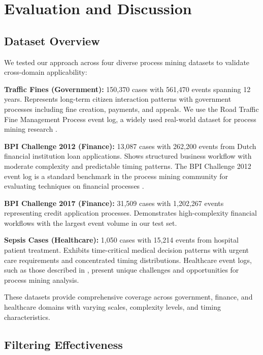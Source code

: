 
\section{Evaluation and Discussion}
\label{sec:evaluation}

\subsection{Dataset Overview}
\label{subsec:datasets}

We tested our approach across four diverse process mining datasets to validate cross-domain applicability:

\textbf{Traffic Fines (Government):} 150,370 cases with 561,470 events spanning 12 years. Represents long-term citizen interaction patterns with government processes including fine creation, payments, and appeals. We use the Road Traffic Fine Management Process event log, a widely used real-world dataset for process mining research \cite{deleoni2015traffic}.

\textbf{BPI Challenge 2012 (Finance):} 13,087 cases with 262,200 events from Dutch financial institution loan applications. Shows structured business workflow with moderate complexity and predictable timing patterns. The BPI Challenge 2012 event log is a standard benchmark in the process mining community for evaluating techniques on financial processes \cite{vandongen2012bpi}.

\textbf{BPI Challenge 2017 (Finance):} 31,509 cases with 1,202,267 events representing credit application processes. Demonstrates high-complexity financial workflows with the largest event volume in our test set.

\textbf{Sepsis Cases (Healthcare):} 1,050 cases with 15,214 events from hospital patient treatment. Exhibits time-critical medical decision patterns with urgent care requirements and concentrated timing distributions. Healthcare event logs, such as those described in \cite{rojas2016healthcare}, present unique challenges and opportunities for process mining analysis.

These datasets provide comprehensive coverage across government, finance, and healthcare domains with varying scales, complexity levels, and timing characteristics.

\subsection{Filtering Effectiveness}
\label{subsec:filtering_results}


